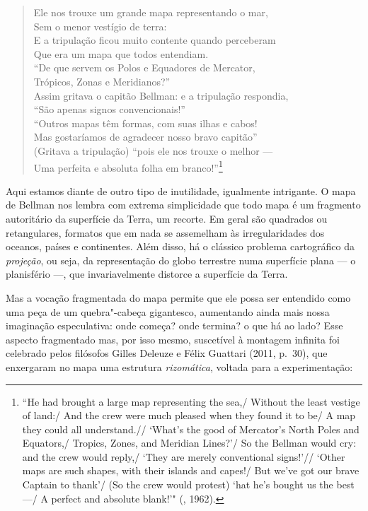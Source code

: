 \begin{verse}
Ele nos trouxe um grande mapa \qb{}representando o mar,\\
Sem o menor vestígio de terra:\\
E a tripulação ficou muito contente \qb{}quando perceberam\\
Que era um mapa que todos entendiam.\\[5pt]
``De que servem os Polos e Equadores \qb{}de Mercator,\\
Trópicos, Zonas e Meridianos?''\\
Assim gritava o capitão Bellman: e a \qb{}tripulação respondia,\\
``São apenas signos convencionais!''\\[5pt]
``Outros mapas têm formas, com suas \qb{}ilhas e cabos!\\
Mas gostaríamos de agradecer nosso \qb{}bravo capitão''\\
(Gritava a tripulação) ``pois ele nos \qb{}trouxe o melhor ---\\
Uma perfeita e absoluta folha em \qb{}branco!''\footnote{``He had brought a
  large map representing the sea,/ Without the least vestige of land:/
  And the crew were much pleased when they found it to be/ A map they
  could all understand.// `What's the good of Mercator's North Poles
  and Equators,/ Tropics, Zones, and Meridian Lines?'/ So the Bellman
  would cry: and the crew would reply,/ `They are merely conventional
  signs!'// `Other maps are such shapes, with their islands and capes!/
  But we've got our brave Captain to thank'/ (So the crew would
  protest) `hat he's bought us the best ---/ A perfect and absolute
  blank!'" (, 1962).}
\end{verse}

Aqui estamos diante de outro tipo de inutilidade, igualmente intrigante.
O mapa de Bellman nos lembra com extrema simplicidade que todo mapa é um
fragmento autoritário da superfície da Terra, um recorte. Em geral são
quadrados ou retangulares, formatos que em nada se assemelham às
irregularidades dos oceanos, países e continentes. Além disso, há o
clássico problema cartográfico da \emph{projeção}, ou seja, da
representação do globo terrestre numa superfície plana --- o planisfério
---, que invariavelmente distorce a superfície da Terra.

Mas a vocação fragmentada do mapa permite que ele possa ser entendido
como uma peça de um quebra"-cabeça gigantesco, aumentando ainda mais
nossa imaginação especulativa: onde começa? onde termina? o que há ao
lado? Esse aspecto fragmentado mas, por isso mesmo, suscetível à
montagem infinita foi celebrado pelos filósofos Gilles Deleuze e Félix Guattari (2011, p.~30), que enxergaram no mapa uma estrutura
\emph{rizomática}, voltada para a experimentação:

